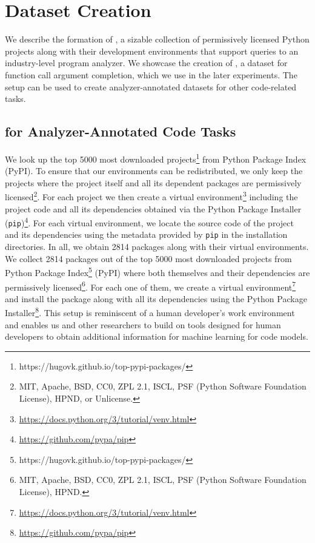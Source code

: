 \section{Dataset Creation}
\label{sec:dataset}

We describe the formation of \PyEnvs, a sizable collection of permissively licensed Python projects along with their development environments that support queries to an industry-level program analyzer. 
We showcase the creation of \CallArgs, a dataset for function call argument completion, which we use in the later experiments.
The setup can be used to create analyzer-annotated datasets for other code-related tasks.

\subsection{\PyEnvs for Analyzer-Annotated Code Tasks}
\label{sec:dataset-pyenvs}
\ifaaai
We look up the top 5000 most downloaded projects\footnote{https://hugovk.github.io/top-pypi-packages/} from Python Package Index (PyPI). 
To ensure that our environments can be redistributed, we only keep the projects where the project itself and all its dependent packages are permissively licensed\footnote{MIT, Apache, BSD, CC0, ZPL 2.1, ISCL, PSF (Python Software Foundation License), HPND, or Unlicense.}.
For each project we then create a virtual environment\footnote{\url{https://docs.python.org/3/tutorial/venv.html}} including the project code and all its dependencies obtained via the Python Package Installer (\verb|pip|)\footnote{\url{https://github.com/pypa/pip}}. 
For each virtual environment, we locate the source code of the project and its dependencies using the metadata provided by \verb|pip| in the installation directories. 
In all, we obtain 2814 packages along with their virtual environments.
\\
\fi
\ifamlc
We collect 2814 packages out of the top 5000 most downloaded projects from Python Package Index\footnote{https://hugovk.github.io/top-pypi-packages/} (PyPI) where both themselves and their dependencies are permissively licensed\footnote{MIT, Apache, BSD, CC0, ZPL 2.1, ISCL, PSF (Python Software Foundation License), HPND.}.
For each one of them, we create a virtual environment\footnote{\url{https://docs.python.org/3/tutorial/venv.html}} and install the package along with all its dependencies using the Python Package Installer\footnote{\url{https://github.com/pypa/pip}}.
\fi
This setup is reminiscent of a human developer's work environment and enables us and other researchers to build on tools designed for human developers to obtain additional information for machine learning for code models. 
